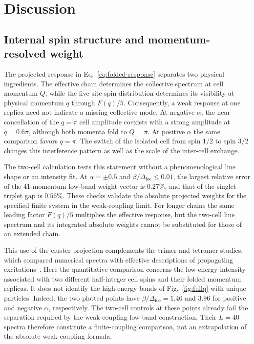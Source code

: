 \section{Discussion}
\label{sec:discussion}

\subsection{Internal spin structure and momentum-resolved weight}

The projected response in Eq.~\eqref{eq:folded-response} separates two
physical ingredients. The effective chain determines the collective spectrum
at cell momentum $Q$, while the five-site spin distribution determines its
visibility at physical momentum $q$ through $F(q)/5$.
Consequently, a weak response at one replica need not indicate a missing
collective mode. At negative $\alpha$, the near cancellation of the
$q=\pi$ cell amplitude coexists with a strong amplitude at $q=0.6\pi$,
although both momenta fold to $Q=\pi$.
At positive $\alpha$ the same comparison favors $q=\pi$.
The switch of the isolated cell from spin $1/2$ to spin $3/2$ changes this
interference pattern as well as the scale of the inter-cell exchange.

The two-cell calculation tests this statement without a phenomenological
line shape or an intensity fit. At $\alpha=\pm0.5$ and
$\beta/\Delta_{\mathrm{loc}}\le0.01$, the largest relative error of the
41-momentum low-band weight vector is $0.27\%$, and that of the
singlet--triplet gap is $0.56\%$.
These checks validate the absolute projected weights for the specified
finite system in the weak-coupling limit.
For longer chains the same leading factor $F(q)/5$ multiplies the effective
response, but the two-cell line spectrum and its integrated absolute
weights cannot be substituted for those of an extended chain.

This use of the cluster projection complements the trimer and tetramer
studies, which compared numerical spectra with effective descriptions of
propagating excitations~\cite{cheng2022trimer,li2026tetramer}.
Here the quantitative comparison concerns the low-energy intensity associated
with two different half-integer cell spins and their folded momentum
replicas. It does not identify the high-energy bands of
Fig.~\ref{fig:fullq} with unique particles.
Indeed, the two plotted points have
$\beta/\Delta_{\mathrm{loc}}=1.46$ and $3.96$ for positive and negative
$\alpha$, respectively. The two-cell controls at these points already fail
the separation required by the weak-coupling low-band construction.
Their $L=40$ spectra therefore constitute a finite-coupling comparison,
not an extrapolation of the absolute weak-coupling formula.


